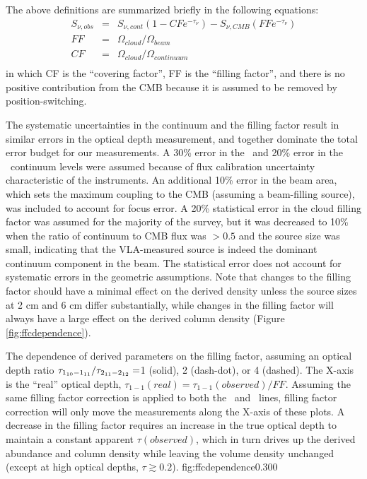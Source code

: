 The above definitions are summarized briefly in the following equations:
\begin{eqnarray*}
  S_{\nu,obs} &=& S_{\nu,cont} (1-CF e^{-\tau_{\nu}}) - S_{\nu,CMB} (FF e^{-\tau_{\nu}}) \\
  FF &=& \Omega_{cloud} / \Omega_{beam} \\ 
  CF &=& \Omega_{cloud} / \Omega_{continuum} \\ 
\end{eqnarray*}
in which CF is the ``covering factor'', FF is the ``filling factor'', and there
is no positive contribution from the CMB because it is assumed to be removed by
position-switching.


The systematic uncertainties in the continuum and the filling factor result in
similar errors in the optical depth measurement, and together dominate the
total error budget for our measurements.  A 30\% error in the \oneone\ and 20\%
error in the \twotwo\ continuum levels were assumed because of flux calibration
uncertainty characteristic of the instruments. An additional 10\% error in the beam area, which sets the maximum
coupling to the CMB (assuming a beam-filling source), was included to account 
for focus error.
A 20\% statistical error in the cloud filling factor was assumed for the majority of the
survey, but it was decreased to 10\% when the ratio of continuum to CMB flux was $>0.5$ and the source
size was small, indicating that the VLA-measured source is indeed the dominant
continuum component in the beam.  The statistical error does not account for systematic
errors in the geometric assumptions.  Note that changes to the filling factor
should have a minimal effect on the derived density unless the source sizes at
2 cm and 6 cm differ substantially, while changes in the filling factor will
always have a large effect on the derived column density (Figure
\ref{fig:ffcdependence}).

{The dependence of derived parameters on the filling factor, assuming an
optical depth ratio $\tau_{1_{10}-1_{11}}/\tau_{2_{11}-2_{12}} =$1 (solid), 2 (dash-dot),
or 4 (dashed).  
The X-axis is the ``real'' optical depth, $\tau_{1-1}(real) = \tau_{1-1}(observed) / FF$.
Assuming the same filling factor correction is applied to both
the \oneone\ and \twotwo\ lines, filling factor correction will only move the
measurements along the X-axis of these plots.  A decrease in the filling factor
requires an increase in the true optical depth to maintain a constant apparent
$\tau(observed)$, which in turn drives up the derived abundance and column density while
leaving the volume density unchanged (except at high optical depths,
$\tau\gtrsim0.2$).
}
{fig:ffcdependence}{0.30}{0}


